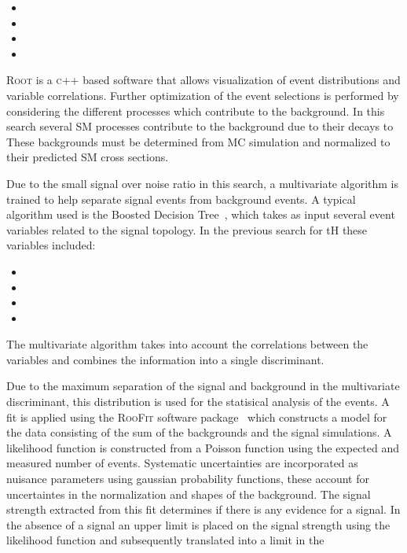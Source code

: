 \documentclass[final,3p]{CSP}
\begin{document}
\begin{itemize}
\item
\item
\item
\item

\end{itemize}


\textsc{Root} is a \textsc{c++} based software that allows visualization of event distributions and variable correlations.
Further optimization of the event selections is performed by considering the different processes which contribute to the background.
In this search several SM processes contribute to the background due to their decays to 
These backgrounds must be determined from MC simulation and normalized to their predicted SM cross sections. 

Due to the small signal over noise ratio in this search, a multivariate algorithm is trained to help separate signal events from background events.
A typical algorithm used is the Boosted Decision Tree~\cite{hoecker2007tmva}, which takes as input several event variables related to the signal topology.
In the previous search for tH these variables included:
\begin{itemize}
\item
\item
\item
\item
\end{itemize}
The multivariate algorithm takes into account the correlations between the variables and combines the information into a single discriminant.

Due to the maximum separation of the signal and background in the multivariate discriminant, this distribution is used for the statisical analysis of the events.
A fit is applied using the \textsc{RooFit} software package~\cite{verkerke2008roofit} which constructs a model for the data consisting of the sum of the backgrounds and the signal simulations. A likelihood function is constructed from a Poisson function using the expected and measured number of events.
Systematic uncertainties are incorporated as nuisance parameters using gaussian probability functions, these account for uncertaintes in the normalization and shapes of the background.
The signal strength extracted from this fit determines if there is any evidence for a signal.
In the absence of a signal an upper limit is placed on the signal strength using the likelihood function and subsequently translated into a limit in the 
\end{document}
